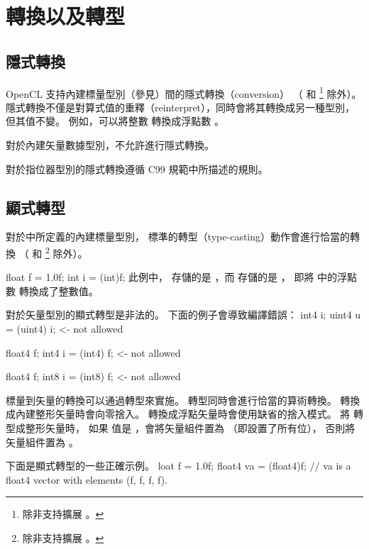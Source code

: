\section[sec:conversionCast]{轉換以及轉型}

\subsection[sec:implicityConversion]{隱式轉換}

OpenCL 支持內建標量型別（參見）間的隱式轉換（conversion）
（ 和 \footnote{除非支持擴展 。} 除外）。
隱式轉換不僅是對算式值的重釋（reinterpret），同時會將其轉換成另一種型別，但其值不變。
例如，可以將整數  轉換成浮點數 。

對於內建矢量數據型別，不允許進行隱式轉換。

對於指位器型別的隱式轉換遵循 C99 規範中所描述的規則。

\subsection[sec:explicitCast]{顯式轉型}

對於中所定義的內建標量型別，
標準的轉型（type-casting）動作會進行恰當的轉換
（ 和 \footnote{除非支持擴展 。} 除外）。

\startclc[indentnext=no]
float	f = 1.0f;
int	i = (int)f;
\stopclc
此例中，
 存儲的是 ，而  存儲的是 ，
即將  中的浮點數  轉換成了整數值。

對於矢量型別的顯式轉型是非法的。
下面的例子會導致編譯錯誤：
\startclc
int4	i;
uint4	u = (uint4) i;	<- not allowed

float4	f;
int4	i = (int4) f;	<- not allowed

float4	f;
int8	i = (int8) f;	<- not allowed
\stopclc

標量到矢量的轉換可以通過轉型來實施。
轉型同時會進行恰當的算術轉換。
轉換成內建整形矢量時會向零捨入。
轉換成浮點矢量時會使用缺省的捨入模式。
將  轉型成整形矢量時，
如果  值是 ，會將矢量組件置為  （即設置了所有位），
否則將矢量組件置為 。

下面是顯式轉型的一些正確示例。
\startclc
loat	f = 1.0f;
float4	va = (float4)f;
// va is a float4 vector with elements (f, f, f, f).

